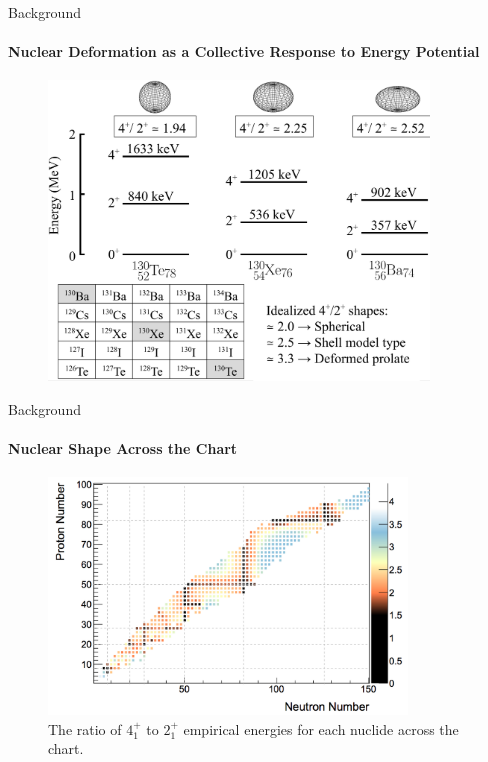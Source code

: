 \documentclass{beamer}
\begin{document}
\begin{frame}{Background}
\framesubtitle{Nuclear Deformation as a Collective Response to Energy Potential}
\begin{figure}[!hht]
  \centering
  \includegraphics[width=0.9\textwidth, keepaspectratio]{CastenLevels_2.png}
\end{figure}
\end{frame}



\begin{frame}{Background}
\framesubtitle{Nuclear Shape Across the Chart}
\begin{figure}[!hht]
  \centering
  \includegraphics[width=0.85\textwidth, keepaspectratio]{Evitts4and2.png}
  \caption{The ratio of $4^+_1$ to $2^+_1$ empirical energies for each nuclide across the chart\footnotemark[1].}
  \label{comparison}
\end{figure}
\end{frame}
\end{document}
